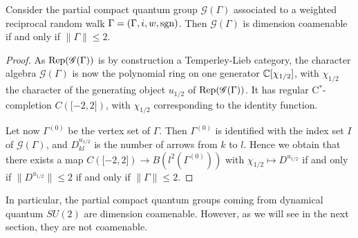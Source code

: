  \begin{Prop} Consider the partial compact quantum group $\mathscr{G}(\Gamma)$ associated to a weighted reciprocal random walk $\Gamma = (\Gamma,i,w,\operatorname{\mathrm{sgn}})$. Then $\mathscr{G}(\Gamma)$ is dimension coamenable if and only if $\|\Gamma\| \leq 2$. 
 \end{Prop}%
 \begin{proof} As $\mathrm{Rep}(\mathscr{G}(\Gamma))$ is by construction a Temperley-Lieb category,  the character algebra $\mathscr{G}(\Gamma)$ is now the polynomial ring on one generator $\mathbb{C}\lbrack \chi_{1/2}\rbrack$, with $\chi_{1/2}$ the character of the generating object $u_{1/2}$ of $\mathrm{Rep}(\mathscr{G}(\Gamma))$. It has regular C$^*$-completion $C(\lbrack -2,2\rbrack)$, with $\chi_{1/2}$ corresponding to the identity function. 
 
Let now $\Gamma^{(0)}$ be the vertex set of $\Gamma$. Then $\Gamma^{(0)}$ is identified with the index set $I$ of $\mathscr{G}(\Gamma)$, and $D^{u_{1/2}}_{kl}$ is the number of arrows from $k$ to $l$. Hence we obtain that there exists a map $C(\lbrack -2,2\rbrack) \rightarrow B(l^2(\Gamma^{(0)}))$ with $\chi_{1/2}\mapsto D^{u_{1/2}}$ if and only if $\|D^{u_{1/2}}\| \leq  2$ if and only if $\|\Gamma\|\leq 2$.   
 \end{proof} 
 
 In particular, the partial compact quantum groups coming from
 dynamical quantum $SU(2)$ are dimension coamenable. However, as we
 will see in the next section, they are not coamenable.


